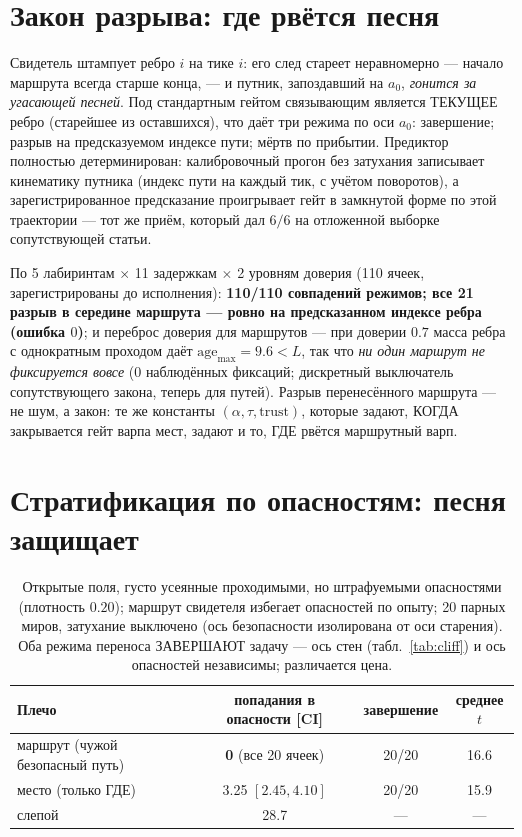 \documentclass{article}
\begin{document}
\section{Закон разрыва: где рвётся песня}
\label{sec:rupture}

Свидетель штампует ребро $i$ на тике $i$: его след стареет
неравномерно --- начало маршрута всегда старше конца, --- и путник,
запоздавший на $a_0$, \emph{гонится за угасающей песней}. Под
стандартным гейтом связывающим является ТЕКУЩЕЕ ребро (старейшее из
оставшихся), что даёт три режима по оси $a_0$: завершение; разрыв на
предсказуемом индексе пути; мёртв по прибытии. Предиктор полностью
детерминирован: калибровочный прогон без затухания записывает
кинематику путника (индекс пути на каждый тик, с учётом поворотов), а
зарегистрированное предсказание проигрывает гейт в замкнутой форме по
этой траектории --- тот же приём, который дал $6/6$ на отложенной
выборке сопутствующей статьи.

По 5 лабиринтам $\times$ 11 задержкам $\times$ 2 уровням доверия (110
ячеек, зарегистрированы до исполнения): \textbf{110/110 совпадений
режимов; все 21 разрыв в середине маршрута --- ровно на предсказанном
индексе ребра (ошибка $0$)}; и переброс доверия для маршрутов --- при
доверии $0.7$ масса ребра с однократным проходом даёт
$\mathrm{age}_{\max} = 9.6 < L$, так что \emph{ни один маршрут не
фиксируется вовсе} ($0$ наблюдённых фиксаций; дискретный выключатель
сопутствующего закона, теперь для путей). Разрыв перенесённого
маршрута --- не шум, а закон: те же константы
$(\alpha,\tau,\text{trust})$, которые задают, КОГДА закрывается гейт
варпа мест, задают и то, ГДЕ рвётся маршрутный варп.

\section{Стратификация по опасностям: песня защищает}
\label{sec:hazard}

\begin{table}[h]
\centering
\caption{Открытые поля, густо усеянные проходимыми, но штрафуемыми
опасностями (плотность $0.20$); маршрут свидетеля избегает опасностей
по опыту; 20 парных миров, затухание выключено (ось безопасности
изолирована от оси старения). Оба режима переноса ЗАВЕРШАЮТ задачу ---
ось стен (табл.~\ref{tab:cliff}) и ось опасностей независимы;
различается цена.}
\label{tab:hazard}
\small
\begin{tabular}{lccc}
\toprule
Плечо & попадания в опасности [CI] & завершение & среднее $t$ \\
\midrule
маршрут (чужой безопасный путь) & \textbf{0} (все 20 ячеек) & 20/20 & 16.6 \\
место (только ГДЕ) & 3.25 $[2.45, 4.10]$ & 20/20 & 15.9 \\
слепой & 28.7 & --- & --- \\
\bottomrule
\end{tabular}
\end{table}
\end{document}
